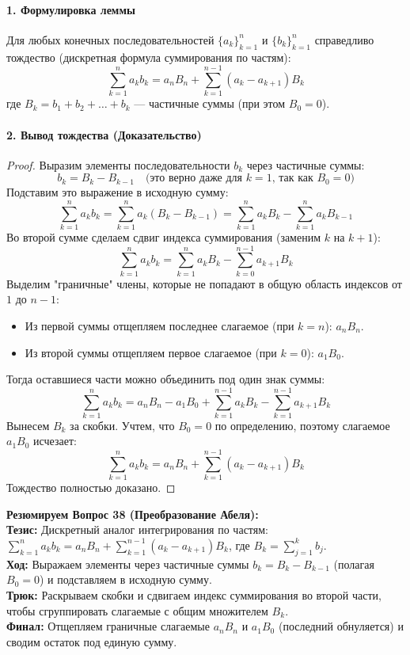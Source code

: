 \paragraph{1. Формулировка леммы}
Для любых конечных последовательностей $\{a_k\}_{k=1}^n$ и $\{b_k\}_{k=1}^n$ справедливо тождество (дискретная формула суммирования по частям):
$$ \sum_{k=1}^n a_k b_k = a_n B_n + \sum_{k=1}^{n-1} (a_k - a_{k+1}) B_k $$
где $B_k = b_1 + b_2 + \dots + b_k$ — частичные суммы (при этом $B_0 = 0$).

\paragraph{2. Вывод тождества (Доказательство)}
\begin{proof}
Выразим элементы последовательности $b_k$ через частичные суммы:
$$ b_k = B_k - B_{k-1} \quad \text{(это верно даже для } k=1 \text{, так как } B_0 = 0\text{)} $$
Подставим это выражение в исходную сумму:
$$ \sum_{k=1}^n a_k b_k = \sum_{k=1}^n a_k (B_k - B_{k-1}) = \sum_{k=1}^n a_k B_k - \sum_{k=1}^n a_k B_{k-1} $$
Во второй сумме сделаем сдвиг индекса суммирования (заменим $k$ на $k+1$):
$$ \sum_{k=1}^n a_k b_k = \sum_{k=1}^n a_k B_k - \sum_{k=0}^{n-1} a_{k+1} B_k $$
Выделим "граничные" члены, которые не попадают в общую область индексов от $1$ до $n-1$:
\begin{itemize}
    \item Из первой суммы отщепляем последнее слагаемое (при $k=n$): $a_n B_n$.
    \item Из второй суммы отщепляем первое слагаемое (при $k=0$): $a_1 B_0$.
\end{itemize}
Тогда оставшиеся части можно объединить под один знак суммы:
$$ \sum_{k=1}^n a_k b_k = a_n B_n - a_1 B_0 + \sum_{k=1}^{n-1} a_k B_k - \sum_{k=1}^{n-1} a_{k+1} B_k $$
Вынесем $B_k$ за скобки. Учтем, что $B_0 = 0$ по определению, поэтому слагаемое $a_1 B_0$ исчезает:
$$ \sum_{k=1}^n a_k b_k = a_n B_n + \sum_{k=1}^{n-1} (a_k - a_{k+1}) B_k $$
Тождество полностью доказано.
\end{proof}


\begin{tcolorbox}[colback=gray!5, colframe=black, boxrule=0.5pt, arc=0pt]
\textbf{Резюмируем Вопрос 38 (Преобразование Абеля):} \\
\textbf{Тезис:} Дискретный аналог интегрирования по частям: $\sum_{k=1}^n a_k b_k = a_n B_n + \sum_{k=1}^{n-1} (a_k - a_{k+1}) B_k$, где $B_k = \sum_{j=1}^k b_j$. \\
\textbf{Ход:} Выражаем элементы через частичные суммы $b_k = B_k - B_{k-1}$ (полагая $B_0 = 0$) и подставляем в исходную сумму. \\
\textbf{Трюк:} Раскрываем скобки и сдвигаем индекс суммирования во второй части, чтобы сгруппировать слагаемые с общим множителем $B_k$. \\
\textbf{Финал:} Отщепляем граничные слагаемые $a_n B_n$ и $a_1 B_0$ (последний обнуляется) и сводим остаток под единую сумму.
\end{tcolorbox}



